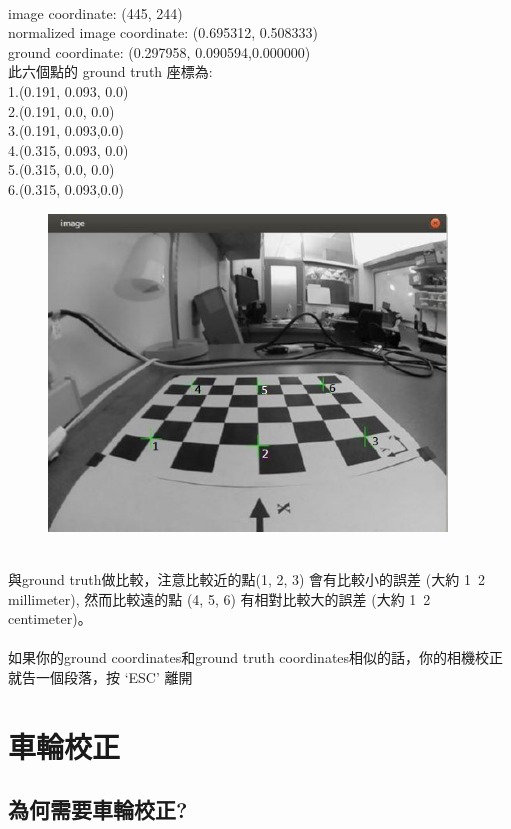 \documentclass{article}
\begin{document}
\\image coordinate: (445, 244)
\\normalized image coordinate: (0.695312, 0.508333)
\\ground coordinate: (0.297958, 0.090594,0.000000)
\\此六個點的 ground truth 座標為:
\\1.(0.191, 0.093, 0.0)
\\2.(0.191, 0.0, 0.0)
\\3.(0.191, 0.093,0.0)
\\4.(0.315, 0.093, 0.0)
\\5.(0.315, 0.0, 0.0)
\\6.(0.315, 0.093,0.0)
\\
\begin{figure}[htp]
    \begin{center}
        \includegraphics[width=300pt]{pic/圖片21.jpg}
    \end{center}
\end{figure}
\\
與ground truth做比較，注意比較近的點(1, 2, 3) 會有比較小的誤差 (大約 1~2 millimeter), 然而比較遠的點 (4, 5, 6) 有相對比較大的誤差 (大約 1~2 centimeter)。
\\
\\如果你的ground coordinates和ground truth coordinates相似的話，你的相機校正就告一個段落，按 ‘ESC’ 離開

\section{車輪校正}

\subsection{為何需要車輪校正?}
\end{document}

